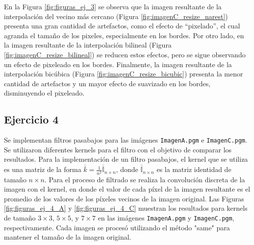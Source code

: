 \documentclass[11pt, twocolumn]{article}
\begin{document}
En la Figura \ref{fig:figuras_ej_3} se observa que la imagen resultante de la interpolación del vecino más cercano (Figura \ref{fig:imagenC_resize_narest}) presenta una gran cantidad de artefactos, como el efecto de ``pixelado'', el cual agranda el tamaño de los pixeles, especialmente en los bordes. Por otro lado, en la imagen resultante de la interpolación bilineal (Figura \ref{fig:imagenC_resize_bilineal}) se reducen estos efectos, pero se sigue observando un efecto de pixeleado en los bordes. Finalmente, la imagen resultante de la interpolación bicúbica (Figura \ref{fig:imagenC_resize_bicubic}) presenta la menor cantidad de artefactos y un mayor efecto de suavizado en los bordes, disminuyendo el pixeleado.

\subsection*{Ejercicio 4}

Se implementan filtros pasabajos para las imágenes \texttt{ImagenA.pgm} e \texttt{ImagenC.pgm}. Se utilizaron diferentes kernels para el filtro con el objetivo de comparar los resultados. Para la implementación de un filtro pasabajos, el kernel que se utiliza es una matriz de la forma $\overline{\overline{k} }  = \frac{1}{n^2} \overline{\overline{\mathbb{I}}}_{n\times n}$, donde $\overline{\overline{\mathbb{I}}}_{n\times n}$ es la matriz identidad de tamaño $n \times n$. Para el proceso de filtrado se realiza la convolución discreta de la imagen con el kernel, en donde el valor de cada píxel de la imagen resultante es el promedio de los valores de los píxeles vecinos de la imagen original. Las Figuras \ref{fig:figuras_ej_4_A} y \ref{fig:figuras_ej_4_C} muestran los resultados para kernels de tamaño $3 \times 3$, $5 \times 5$, y $7 \times 7$ en las imágenes \texttt{ImagenA.pgm} y \texttt{ImagenC.pgm}, respectivamente. Cada imagen se procesó utilizando el método "same" para mantener el tamaño de la imagen original.
\end{document}
